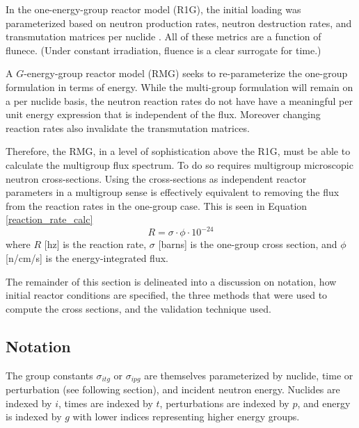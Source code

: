 In the one-energy-group reactor model (R1G), the initial loading was parameterized based
on neutron production rates, neutron destruction rates, and transmutation matrices per
nuclide \cite{Scopatz2009d}.  All of these metrics are a function of flunece.  (Under 
constant irradiation, fluence is a clear surrogate for time.)

A $G$-energy-group reactor model (RMG) seeks to re-parameterize the one-group formulation 
in terms of energy.  While the multi-group formulation will remain on a per nuclide basis, 
the neutron reaction rates do not have have a meaningful per unit energy expression that 
is independent of the flux.  Moreover changing reaction rates also invalidate the 
transmutation matrices.  

Therefore, the RMG, in a level of sophistication above the R1G, must be able to calculate
the multigroup flux spectrum.  To do so requires multigroup microscopic neutron cross-sections.  
Using the cross-sections as independent reactor parameters in a multigroup sense is 
effectively equivalent to removing the flux from the reaction rates in the one-group case.
This is seen in Equation \ref{reaction_rate_calc}
\begin{equation}
\label{reaction_rate_calc}
R = \sigma \cdot \phi \cdot 10^{-24}
\end{equation}
where $R$ [hz] is the reaction rate, $\sigma$ [barns] is the one-group cross section, and
$\phi$ [n/cm/s] is the energy-integrated flux.

The remainder of this section is delineated into a discussion on notation, how initial 
reactor conditions are specified, the three methods that were used to compute the
cross sections, and the validation technique used.

\subsection{Notation}
The group constants $\sigma_{itg}$ or $\sigma_{ipg}$ are themselves parameterized by nuclide, 
time or perturbation (see following section), and  incident neutron energy.  Nuclides are indexed by 
$i$, times are indexed by $t$, perturbations are indexed by $p$, and energy is indexed by $g$ with 
lower indices representing higher energy groups.

